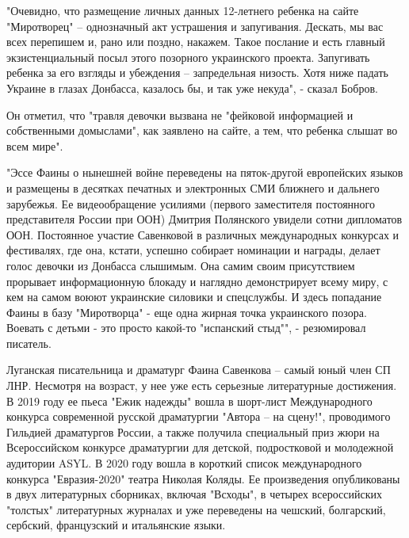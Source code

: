 "Очевидно, что размещение личных данных 12-летнего ребенка на сайте
"Миротворец" – однозначный акт устрашения и запугивания. Дескать, мы вас всех
перепишем и, рано или поздно, накажем. Такое послание и есть главный
экзистенциальный посыл этого позорного украинского проекта. Запугивать ребенка
за его взгляды и убеждения – запредельная низость. Хотя ниже падать Украине в
глазах Донбасса, казалось бы, и так уже некуда", - сказал Бобров.

Он отметил, что "травля девочки вызвана не "фейковой информацией и собственными
домыслами", как заявлено на сайте, а тем, что ребенка слышат во всем мире".

"Эссе Фаины о нынешней войне переведены на пяток-другой европейских языков и
размещены в десятках печатных и электронных СМИ ближнего и дальнего зарубежья.
Ее видеообращение усилиями (первого заместителя постоянного представителя
России при ООН) Дмитрия Полянского увидели сотни дипломатов ООН. Постоянное
участие Савенковой в различных международных конкурсах и фестивалях, где она,
кстати, успешно собирает номинации и награды, делает голос девочки из Донбасса
слышимым. Она самим своим присутствием прорывает информационную блокаду и
наглядно демонстрирует всему миру, с кем на самом воюют украинские силовики и
спецслужбы. И здесь попадание Фаины в базу "Миротворца" - еще одна жирная точка
украинского позора. Воевать с детьми - это просто какой-то "испанский стыд"", -
резюмировал писатель.

Луганская писательница и драматург Фаина Савенкова – самый юный член СП ЛНР.
Несмотря на возраст, у нее уже есть серьезные литературные достижения. В 2019
году ее пьеса "Ежик надежды" вошла в шорт-лист Международного конкурса
современной русской драматургии "Автора – на сцену!", проводимого Гильдией
драматургов России, а также получила специальный приз жюри на Всероссийском
конкурсе драматургии для детской, подростковой и молодежной аудитории ASYL. В
2020 году вошла в короткий список международного конкурса "Евразия-2020" театра
Николая Коляды. Ее произведения опубликованы в двух литературных сборниках,
включая "Всходы", в четырех всероссийских "толстых" литературных журналах и уже
переведены на чешский, болгарский, сербский, французский и итальянские языки.
